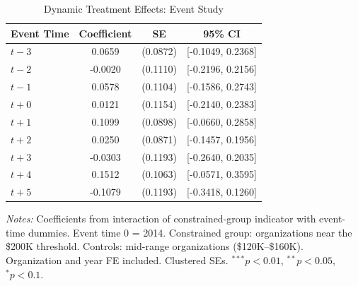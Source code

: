 \begin{table}[htbp]
\centering
\caption{Dynamic Treatment Effects: Event Study}
\label{tab:event_study}
\begin{tabular}{lccc}
\hline\hline
Event Time & Coefficient & SE & 95\% CI \\
\hline
$t-3$ & 0.0659 & (0.0872) & [-0.1049, 0.2368] \\
$t-2$ & -0.0020 & (0.1110) & [-0.2196, 0.2156] \\
$t-1$ & 0.0578 & (0.1104) & [-0.1586, 0.2743] \\
$t+0$ & 0.0121 & (0.1154) & [-0.2140, 0.2383] \\
$t+1$ & 0.1099 & (0.0898) & [-0.0660, 0.2858] \\
$t+2$ & 0.0250 & (0.0871) & [-0.1457, 0.1956] \\
$t+3$ & -0.0303 & (0.1193) & [-0.2640, 0.2035] \\
$t+4$ & 0.1512 & (0.1063) & [-0.0571, 0.3595] \\
$t+5$ & -0.1079 & (0.1193) & [-0.3418, 0.1260] \\
\hline\hline
\end{tabular}
\begin{tablenotes}
\item \textit{Notes:} Coefficients from interaction of constrained-group indicator with event-time dummies. 
Event time 0 = 2014. Constrained group: organizations near the \$200K threshold. 
Controls: mid-range organizations (\$120K--\$160K). Organization and year FE included. Clustered SEs. 
$^{***}p<0.01$, $^{**}p<0.05$, $^{*}p<0.1$.
\end{tablenotes}
\end{table}
